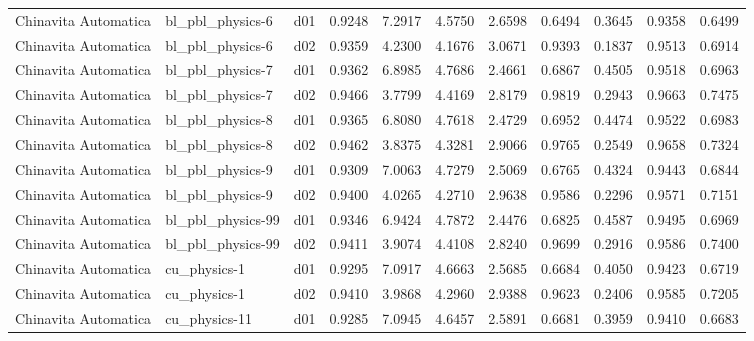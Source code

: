 \begin{longtable}{lllrrrrrrrr}
 Chinavita Automatica  &      bl\_pbl\_physics-6 &     d01 &   0.9248 &   7.2917 &   4.5750 &       2.6598 &        0.6494 &       0.3645 &           0.9358 &  0.6499 \\
 Chinavita Automatica  &      bl\_pbl\_physics-6 &     d02 &   0.9359 &   4.2300 &   4.1676 &       3.0671 &        0.9393 &       0.1837 &           0.9513 &  0.6914 \\
 Chinavita Automatica  &      bl\_pbl\_physics-7 &     d01 &   0.9362 &   6.8985 &   4.7686 &       2.4661 &        0.6867 &       0.4505 &           0.9518 &  0.6963 \\
 Chinavita Automatica  &      bl\_pbl\_physics-7 &     d02 &   0.9466 &   3.7799 &   4.4169 &       2.8179 &        0.9819 &       0.2943 &           0.9663 &  0.7475 \\
 Chinavita Automatica  &      bl\_pbl\_physics-8 &     d01 &   0.9365 &   6.8080 &   4.7618 &       2.4729 &        0.6952 &       0.4474 &           0.9522 &  0.6983 \\
 Chinavita Automatica  &      bl\_pbl\_physics-8 &     d02 &   0.9462 &   3.8375 &   4.3281 &       2.9066 &        0.9765 &       0.2549 &           0.9658 &  0.7324 \\
 Chinavita Automatica  &      bl\_pbl\_physics-9 &     d01 &   0.9309 &   7.0063 &   4.7279 &       2.5069 &        0.6765 &       0.4324 &           0.9443 &  0.6844 \\
 Chinavita Automatica  &      bl\_pbl\_physics-9 &     d02 &   0.9400 &   4.0265 &   4.2710 &       2.9638 &        0.9586 &       0.2296 &           0.9571 &  0.7151 \\
 Chinavita Automatica  &     bl\_pbl\_physics-99 &     d01 &   0.9346 &   6.9424 &   4.7872 &       2.4476 &        0.6825 &       0.4587 &           0.9495 &  0.6969 \\
 Chinavita Automatica  &     bl\_pbl\_physics-99 &     d02 &   0.9411 &   3.9074 &   4.4108 &       2.8240 &        0.9699 &       0.2916 &           0.9586 &  0.7400 \\
 Chinavita Automatica  &          cu\_physics-1 &     d01 &   0.9295 &   7.0917 &   4.6663 &       2.5685 &        0.6684 &       0.4050 &           0.9423 &  0.6719 \\
 Chinavita Automatica  &          cu\_physics-1 &     d02 &   0.9410 &   3.9868 &   4.2960 &       2.9388 &        0.9623 &       0.2406 &           0.9585 &  0.7205 \\
 Chinavita Automatica  &         cu\_physics-11 &     d01 &   0.9285 &   7.0945 &   4.6457 &       2.5891 &        0.6681 &       0.3959 &           0.9410 &  0.6683 \\

\end{longtable}
